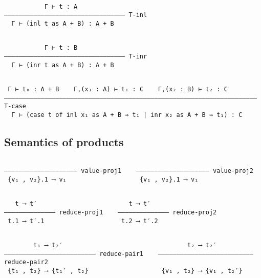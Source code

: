 \documentclass[11pt]{article}
\theoremstyle{definition}
\begin{document}
\begin{verbatim}

           Γ ⊢ t : A
––––––––––––––––––––––––––––––––– T-inl
  Γ ⊢ (inl t as A + B) : A + B

\end{verbatim}

\begin{verbatim}

           Γ ⊢ t : B
––––––––––––––––––––––––––––––––– T-inr
  Γ ⊢ (inr t as A + B) : A + B

\end{verbatim}

\begin{verbatim}

 Γ ⊢ t₀ : A + B    Γ,(x₁ : A) ⊢ t₁ : C    Γ,(x₂ : B) ⊢ t₂ : C
––––––––––––––––––––––––––––––––––––––––––––––––––––––––––––––––––––– T-case
  Γ ⊢ (case t of inl x₁ as A + B ⇒ t₁ | inr x₂ as A + B ⇒ t₁) : C

\end{verbatim}

\subsection{Semantics of products}
\label{sec:orgba326f6}

\begin{verbatim}

–––––––––––––––––––– value-proj1    –––––––––––––––––––– value-proj2
 {v₁ , v₂}.1 ⟶ v₁                    {v₁ , v₂}.1 ⟶ v₁

\end{verbatim}

\begin{verbatim}

   t ⟶ t′                         t ⟶ t′
–––––––––––––– reduce-proj1    –––––––––––––– reduce-proj2
 t.1 ⟶ t′.1                     t.2 ⟶ t′.2

\end{verbatim}

\begin{verbatim}

        t₁ ⟶ t₂′                                  t₂ ⟶ t₂′
––––––––––––––––––––––––– reduce-pair1    –––––––––––––––––––––––––– reduce-pair2
 {t₁ , t₂} ⟶ {t₁′ , t₂}                    {v₁ , t₂} ⟶ {v₁ , t₂′}

\end{verbatim}
\end{document}
